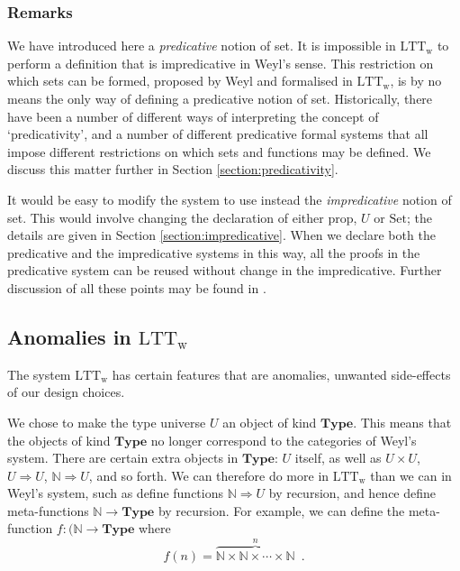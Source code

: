 \documentclass[acmtocl]{acmtrans2m}
\newcommand{\LTTW}{\ensuremath{\mathrm{LTT}_\mathrm{w}}}
\newcommand{\Type}{\mathbf{Type}}
\newcommand{\p}{\mathrm{prop}}
\newcommand{\boldarrow}{\Rightarrow}
\begin{document}
\subsubsection{Remarks}

\begin{longenum}
 \item
We have introduced here a \emph{predicative} notion of set.  It is impossible in $\LTTW$ to perform a definition that is impredicative in Weyl's sense.
This restriction on which sets can be formed, proposed by Weyl and formalised in $\LTTW$, is by no means the only way of defining a predicative notion of set.
Historically, there have been a number of different ways of interpreting the concept of `predicativity', and a number of different predicative formal systems that all impose different restrictions on which sets and functions may be defined.  We discuss this matter further in Section \ref{section:predicativity}.
\item
It would be easy to modify the system to use instead the \emph{impredicative} notion of set.  This would involve changing the declaration of either $\p$, $U$ or $\mathrm{Set}$; the details are given in Section \ref{section:impredicative}.  When we declare both the predicative and the impredicative systems in this way, all the proofs in the predicative system can be reused without change in the impredicative.  Further discussion of all these points may be found in \cite{luo:LTT06}.
\end{longenum}


\subsection{Anomalies in $\LTTW$}
\label{section:anomalies}
The system $\LTTW$ has certain features that are anomalies, unwanted side-effects of our design choices.

We chose to make the type universe $U$ an object of kind $\Type$.  This means that the objects of kind $\Type$ no longer correspond to the categories of Weyl's system.  There are certain extra objects in $\Type$: $U$ itself, as well as $U \times U$, $U \boldarrow U$, $\mathbb{N} \boldarrow U$, and so forth.  We can therefore do more in $\LTTW$ than we can in Weyl's system, such as
define functions $\mathbb{N} \boldarrow U$ by recursion, and hence define meta-functions $\mathbb{N} \rightarrow\Type$ by recursion.  For example, we can define the meta-function $f : (\mathbb{N} \rightarrow \Type$ where
\[ f(n) = \overbrace{\mathbb{N} \times \mathbb{N} \times \cdots \times \mathbb{N}}^{n} \enspace . \]
\end{document}
